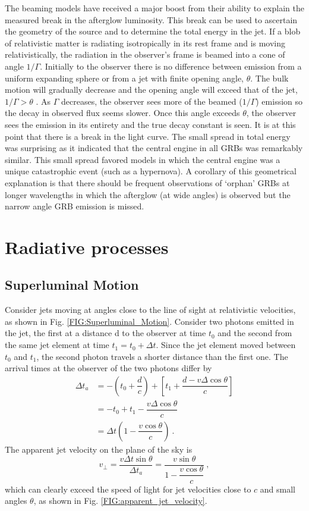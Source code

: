 \documentclass[12pt,a4paper]{article}
\begin{document}
\cite{weekes2003very} The beaming models have received a major boost from their ability to explain the measured break in the afterglow luminosity. This break can be used to ascertain the geometry of the source and to determine the total energy in the jet. If a blob of relativistic matter is radiating isotropically in its rest frame and is moving relativistically, the radiation in the observer’s frame is beamed into a cone of angle $1/\Gamma$. Initially to the observer there is no difference between emission from a uniform expanding sphere or from a jet with finite opening angle, $\theta$. The bulk motion will gradually decrease and the opening angle will exceed that of the jet, $1/\Gamma > \theta$ . As $\Gamma$ decreases, the observer sees more of the beamed ($1/\Gamma$) emission so the decay in observed flux seems slower. Once this angle exceeds $\theta$, the observer sees the emission in its entirety and the true decay constant is seen. It is at this point that there is a break in the light curve. The small spread in total energy was surprising as it indicated that the central engine in all GRBs was remarkably similar. This small spread favored models in which the central engine was a unique catastrophic event (such as a hypernova). A corollary of this geometrical explanation is that there should be frequent observations of `orphan' GRBs at longer wavelengths in which the afterglow (at wide angles) is observed but the narrow angle GRB emission is missed.

\section{Radiative processes}
\subsection{Superluminal Motion}
\cite{courvoisier2012high} Consider jets moving at angles close to the line of sight at relativistic velocities, as shown in Fig. \ref{FIG:Superluminal_Motion}. Consider two photons emitted in the jet, the first at a distance d to the observer at time $t_0$ and the second from the same jet element at time $t_1 = t_0 + \Delta t$. Since the jet element moved between $t_0$ and $t_1$, the second photon travels a shorter distance than the first one. The arrival times at the observer of the two photons differ by
\begin{align}
\nonumber \Delta t_a &= -\left(t_0 +\dfrac{d}{c}\right) +\left[t_1 +\dfrac{d-v\Delta \cos \theta}{c} \right] \\
\nonumber &= -t_0 +t_1 -\dfrac{v \Delta \cos \theta}{c} \\
&= \Delta t \left(1 -\dfrac{v\cos \theta}{c} \right) ~.
\end{align}
The apparent jet velocity on the plane of the sky is
\begin{equation}
v_\perp = \dfrac{v \Delta t \sin \theta}{\Delta t_a} = \dfrac{v \sin \theta}{1 -\dfrac{v \cos \theta}{c}} ~,
\end{equation}
which can clearly exceed the speed of light for jet velocities close to $c$ and small angles $\theta$, as shown in Fig. \ref{FIG:apparent_jet_velocity}.
\end{document}
